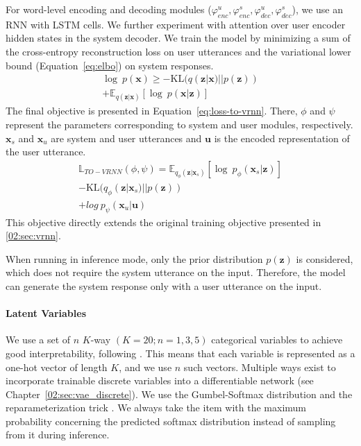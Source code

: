 For word-level encoding and decoding modules ($\varphi_{enc}^u,\varphi_{enc}^s,\varphi_{dec}^u,\varphi_{dec}^s$), we use an RNN with LSTM cells.
We further experiment with attention \cite{bahdanau2014neural} over user encoder hidden states in the system decoder.
We train the model by minimizing a sum of the cross-entropy reconstruction loss on user utterances and the variational lower bound (Equation~\ref{eq:elbo}) on system responses.
\begin{equation}
\begin{split}
    \log~p(\mathbf{x}) \ge -\mathrm{KL}(q(\mathbf{z}|\mathbf{x})||p(\mathbf{z}))\\ + \mathbb{E}_{q(\mathbf{z}|\mathbf{x})}[\log~p(\mathbf{x}|\mathbf{z})]
    \label{eq:elbo}
\end{split}
\end{equation}
The final objective is presented in Equation~\ref{eq:loss-to-vrnn}.
There, $\phi$ and $\psi$ represent the parameters corresponding to system and user modules, respectively. $\mathbf{x}_s$ and $\mathbf{x}_u$ are system and user utterances and $\mathbf{u}$ is the encoded representation of the user utterance.
\begin{equation}
\begin{split}
    \mathbb{L}_{TO-VRNN}(\phi,\psi) = \mathbb{E}_{q_{\phi}(\mathbf{z}|\mathbf{x}_s)}[\log~p_{\phi}(\mathbf{x}_s|\mathbf{z})] \\
    -\mathrm{KL}(q_{\phi}(\mathbf{z}|\mathbf{x}_s)||p(\mathbf{z}))\\
    + log~p_{\psi}(\mathbf{x}_u|\mathbf{u})
\end{split}
    \label{eq:loss-to-vrnn}
\end{equation}
This objective directly extends the original training objective presented in \ref{02:sec:vrnn}.

When running in inference mode, only the prior distribution $p(\mathbf{z})$ is considered, which does not require the system utterance on the input.
Therefore, the model can generate the system response only with a user utterance on the input.

\paragraph{Latent Variables}
\label{05:sec:method_latent}
We use a set of $n$ \mbox{$K$-way} $(K=20;n=1,3,5)$ categorical variables to achieve good interpretability, following \citet{zhao2018unsupervised}.
This means that each variable is represented as a one-hot vector of length $K$, and we use $n$ such vectors.
Multiple ways exist to incorporate trainable discrete variables into a differentiable network (see Chapter~\ref{02:sec:vae_discrete}).
We use the Gumbel-Softmax distribution and the reparameterization trick \cite{jang2017categorical}.
We always take the item with the maximum probability concerning the predicted softmax distribution instead of sampling from it during inference.

